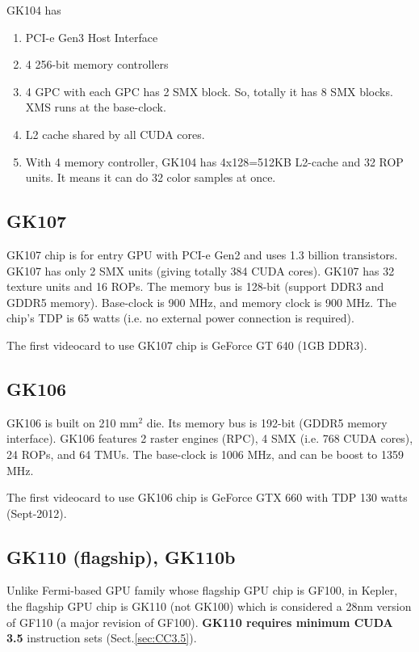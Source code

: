 GK104 has
\begin{enumerate}
  \item PCI-e Gen3 Host Interface
  \item 4 256-bit memory controllers
  \item 4 GPC with each GPC has 2 SMX block. So, totally it has 8 SMX blocks.
  XMS runs at the base-clock. 
  \item L2 cache shared by all CUDA cores.
  \item With 4 memory controller, GK104 has 4x128=512KB L2-cache and 32 ROP units. It
means it can do 32 color samples at once. 
\end{enumerate}




\subsection{GK107}
\label{sec:GK107}

GK107 chip is for entry GPU with PCI-e Gen2 and uses 1.3 billion transistors. 
GK107 has only 2 SMX units (giving totally 384 CUDA cores). GK107 has 32 texture
units and 16 ROPs. The memory bus is 128-bit (support DDR3 and GDDR5 memory).
Base-clock is 900 MHz, and memory clock is 900 MHz. The chip's TDP is 65 watts (i.e. no
external power connection is required).

The first videocard to use GK107 chip is GeForce GT 640 (1GB DDR3).

\subsection{GK106}

GK106 is built on 210 mm$^2$ die. Its memory bus is 192-bit (GDDR5 memory
interface). GK106 features 2 raster engines (RPC), 4 SMX (i.e. 768 CUDA cores),
24 ROPs, and 64 TMUs. The base-clock is 1006 MHz, and can be boost to 1359 MHz.
 
The first videocard to use GK106 chip is GeForce GTX 660 with TDP
130 watts (Sept-2012).



\subsection{GK110 (flagship), GK110b}
\label{sec:GK110}
\label{sec:GK110b}

Unlike Fermi-based GPU family whose flagship GPU chip is GF100, in Kepler, the
flagship GPU chip is GK110 (not GK100) which is considered a 28nm version of
GF110 (a major revision of GF100). {\bf GK110 requires minimum CUDA 3.5}
instruction sets (Sect.\ref{sec:CC3.5}).


